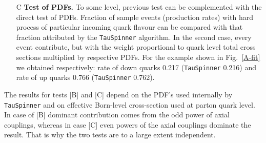 \documentclass{article}
\begin{document}
\begin{enumerate}
An example of such comparison is given in Fig.~\ref{A-fit} for the case of Drell-Yan events with virtuality
in the range of 1~-~1.5~TeV. The fit  gives A= 1.617 +/- 0.002 for up quarks and A= 1.692 +/- 0.003
for down quarks. From the {\tt TauSpinner} calculation using Born amplitude, value of the A parameter
averaged over the same sample (calculated from Born cross section) read respectively 
1.613 and 1.691 with negligible statistical error~\footnote{In this case 
we concentrate on matching the electroweak parameters in initialization of 
{\tt Pythia} and {\tt TauSpinner}, hence the initial state hadronic effects were
switched off. We have checked, that if more complete treatment is used,
quality of the  agreemet between $A$ and $A^{\mathrm {fit}}$ is
degraded by $\sim$0.01, but shapes of the distributions become more complicated.}.
For other choices of the virtualities range agreement was found to be of a similar quality. 

\item[C] {\bf Test of PDFs.}
To some level, previous test can be complemented with the direct test of PDFs.
Fraction of sample events (production rates) with hard process of particular incoming 
quark flavour can be compared with that fraction attributed by the {\tt TauSpinner} algorithm.
In the second case, every event contribute, but with the weight proportional to
quark level total cross sections multiplied by respective PDFs.
For the example shown in Fig.~\ref{A-fit} we obtained respectively:
rate of down quarks 0.217 ({\tt TauSpinner} 0.216) and 
rate of up quarks   0.766 ({\tt TauSpinner} 0.762).
\end{enumerate}

The results for tests [B] and [C] depend on the PDF's used internally by {\tt TauSpinner} and on effective
Born-level cross-section used at parton quark level. In case of [B] dominant contribution
comes from the odd power of axial couplings, whereas in case [C] even powers of 
the axial couplings dominate the result.
That is why the two tests are to a large extent independent.
 
\end{document}
